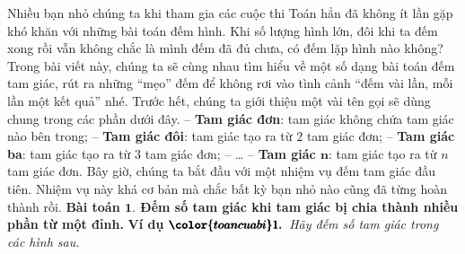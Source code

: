 	Nhiều bạn nhỏ chúng ta khi tham gia các cuộc thi Toán hẳn đã không ít lần gặp khó khăn với những bài toán đếm hình. Khi số lượng hình lớn, đôi khi ta đếm xong rồi vẫn không chắc là mình đếm đã đủ chưa, có đếm lặp hình nào không? Trong bài viết này, chúng ta sẽ cùng nhau tìm hiểu về một số dạng bài toán đếm tam giác, rút ra những “mẹo” đếm để không rơi vào tình cảnh “đếm vài lần, mỗi lần một kết quả” nhé.
	\vskip 0.1cm
	Trước hết, chúng ta giới thiệu một vài tên gọi sẽ dùng chung trong các phần dưới đây.
	\vskip 0.1cm
	-- \textbf{\color{toancuabi}Tam giác đơn}: tam giác không chứa tam giác nào bên trong;
	\vskip 0.1cm
	-- \textbf{\color{toancuabi}Tam giác đôi}: tam giác tạo ra từ $2$ tam giác đơn;
	\vskip 0.1cm
	-- \textbf{\color{toancuabi}Tam giác ba}: tam giác tạo ra  từ $3$ tam giác đơn;
	\vskip 0.1cm
	-- \ldots
	\vskip 0.1cm
	-- \textbf{\color{toancuabi}Tam giác $\pmb{n}$}: tam giác tạo ra từ $n$ tam giác đơn.
	\vskip 0.1cm
	Bây giờ, chúng ta bắt đầu với một nhiệm vụ đếm tam giác đầu tiên. Nhiệm vụ này khá cơ bản mà chắc bất kỳ bạn nhỏ nào cũng đã từng hoàn thành rồi.
	\vskip 0.1cm
	\textbf{\color{toancuabi}Bài toán $\pmb{1.}$ Đếm số tam giác khi tam giác bị chia thành nhiều phần từ một đỉnh.}
	\vskip 0.1cm
	\textbf{\color{toancuabi}Ví dụ} $\pmb{\color{toancuabi}1.}$ \textit{Hãy đếm số tam giác trong các hình sau.}
	\begin{figure}[H]
		\centering
		\vspace*{-5pt}
		\captionsetup{labelformat= empty, justification=centering}
		\captionsetup[subfigure]{labelformat=empty}
		\hfill{}
		\hfill
		\hfill
		\hfill
		\vspace*{-10pt}
	\end{figure}
